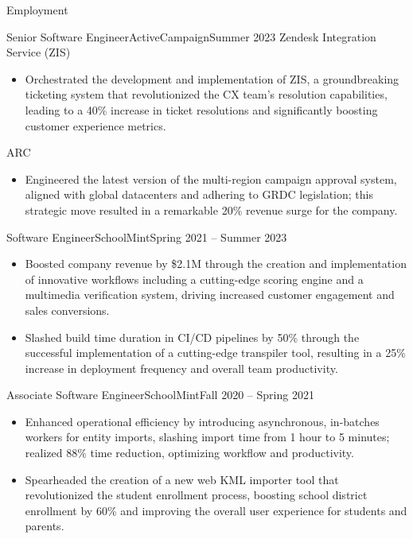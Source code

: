 \documentclass[]{mcdowellcv}
\begin{document}
	\makeheader
	\begin{cvsection}{Employment}
		\begin{cvsubsection}{Senior Software Engineer}{ActiveCampaign}{Summer 2023}
			Zendesk Integration Service (ZIS)
			\begin{itemize}
				\item Orchestrated the development and implementation of ZIS, a groundbreaking ticketing system that revolutionized the CX team's resolution capabilities, leading to a 40\% increase in ticket resolutions and significantly boosting customer experience metrics.
			\end{itemize}
			ARC
			\begin{itemize}
				\item Engineered the latest version of the multi-region campaign approval system, aligned with global datacenters and adhering to GRDC legislation; this strategic move resulted in a remarkable 20\% revenue surge for the company.
			\end{itemize}
		\end{cvsubsection}
		\begin{cvsubsection}{Software Engineer}{SchoolMint}{Spring 2021 -- Summer 2023}		
			\begin{itemize}
				\item Boosted company revenue by \$2.1M through the creation and implementation of innovative workflows including a cutting-edge scoring engine and a multimedia verification system, driving increased customer engagement and sales conversions.
				\item Slashed build time duration in CI/CD pipelines by 50\% through the successful implementation of a cutting-edge transpiler tool, resulting in a 25\% increase in deployment frequency and overall team productivity.
			\end{itemize}
		\end{cvsubsection}
		\begin{cvsubsection}{Associate Software Engineer}{SchoolMint}{Fall 2020 -- Spring 2021}	
			\begin{itemize}
				\item Enhanced operational efficiency by introducing asynchronous, in-batches workers for entity imports, slashing import time from 1 hour to 5 minutes; realized 88\% time reduction, optimizing workflow and productivity.
				\item Spearheaded the creation of a new web KML importer tool that revolutionized the student enrollment process, boosting school district enrollment by 60\% and improving the overall user experience for students and parents.

\end{itemize}
\end{cvsubsection}
\end{cvsection}
\end{document}
